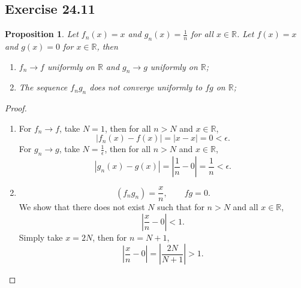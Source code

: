 \documentclass{article}
\newtheorem{proposition}[thm]{Proposition}
\newcommand*{\R}{\ensuremath{\mathbb{R}}}
\begin{document}
\newpage
\subsection*{Exercise 24.11}
\begin{proposition}
    Let $f_n(x)=x$ and $g_n(x)=\frac{1}{n}$ for all $x\in\R$. Let $f(x)=x$ and $g(x)=0$ for $x\in\R$,
    then
    \begin{enumerate}[label=\textbf{(\alph*)}]
        \item $f_n\to f$ uniformly on $\R$ and $g_n\to g$ uniformly on $\R$;
        \item The sequence $f_ng_n$ does not converge uniformly to $fg$ on $\R$;
    \end{enumerate}
\end{proposition}
\begin{proof}\indent
    \begin{enumerate}[label=\textbf{(\alph*)}]
        \item 
        For $f_n\to f$, take $N=1$, then for all $n> N$ and $x\in\R$,
        $$|f_n(x)-f(x)|=|x-x|=0<\epsilon.$$
        For $g_n\to g$, take $N=\frac{1}{\epsilon}$, then for all $n> N$ and $x\in\R$,
        $$|g_n(x)-g(x)|=\left|\frac{1}{n}-0\right|=\frac{1}{n}<\epsilon.$$

        \item 
        $$(f_ng_n)=\frac{x}{n}, \qquad fg = 0.$$ 
        We show that there does not exist $N$ such that for $n>N$ and all $x\in\R$, 
        $$\left|\frac{x}{n}-0\right|<1.$$ Simply take $x=2N$, then for $n=N+1$, 
        $$\left|\frac{x}{n}-0\right|=\left|\frac{2N}{N+1}\right|>1.$$
    \end{enumerate}
\end{proof}
\end{document}
